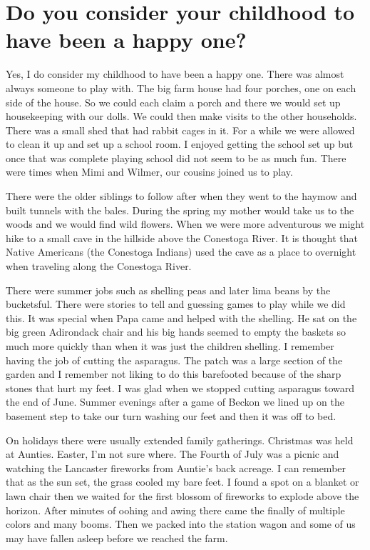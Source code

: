 \section{Do you consider your childhood to have been a happy one?}
Yes, I do consider my childhood to have been a happy one.
There was almost always someone to play with.
The big farm house had four porches, one on each side of the house.
So we could each claim a porch and there we would set up housekeeping with our dolls.
We could then make visits to the other households.
There was a small shed that had rabbit cages in it.
For a while we were allowed to clean it up and set up a school room.
I enjoyed getting the school set up but once that was complete playing school did not seem to be as much fun.
There were times when Mimi and Wilmer, our cousins joined us to play.

There were the older siblings to follow after when they went to the haymow and built tunnels with the bales.
During the spring my mother would take us to the woods and we would find wild flowers.
When we were more adventurous we might hike to a small cave in the hillside above the Conestoga River.
It is thought that Native Americans (the Conestoga Indians) used the cave as a place to overnight when traveling along the Conestoga River.

There were summer jobs such as shelling peas and later lima beans by the bucketsful.
There were stories to tell and guessing games to play while we did this.
It was special when Papa came and helped with the shelling.
He sat on the big green Adirondack chair and his big hands seemed to empty the baskets so much more quickly than when it was just the children shelling.
I remember having the job of cutting the asparagus.
The patch was a large section of the garden and I remember not liking to do this barefooted because of the sharp stones that hurt my feet.
I was glad when we stopped cutting asparagus toward the end of June.
Summer evenings after a game of Beckon we lined up on the basement step to take our turn washing our feet and then it was off to bed.

On holidays there were usually extended family gatherings.
Christmas was held at Aunties.
Easter, I'm not sure where.
The Fourth of July was a picnic and watching the Lancaster fireworks from Auntie's back acreage.
I can remember that as the sun set, the grass cooled my bare feet.
I found a spot on a blanket or lawn chair then we waited for the first blossom of fireworks to explode above the horizon.
After minutes of oohing and awing there came the finally of multiple colors and many booms.
Then we packed into the station wagon and some of us may have fallen asleep before we reached the farm.


